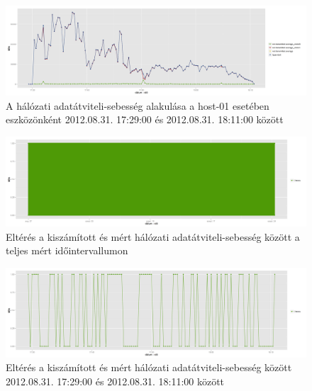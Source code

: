 \documentclass[a4paper,10pt,titlepage]{article}
\begin{document}
\begin{figure}[h!]
\centering
\includegraphics[width=1.00\textwidth]{figures/net_transmitted_average_dev-20120831172900-20120831181100.png}
\caption{ A hálózati adatátviteli-sebesség alakulása a host-01 esetében eszközönként 2012.08.31. 17:29:00 és 2012.08.31. 18:11:00 között \label{fig:net_transmitted_average_dev}}
\end{figure}

\begin{figure}[h!]
\centering
\includegraphics[width=1.00\textwidth]{figures/net_transmitted_average_diff-20120826230140-20120924083120.png}
\caption{ Eltérés a kiszámított és mért hálózati adatátviteli-sebesség között a teljes mért időintervallumon \label{fig:net_transmitted_average_diff-01}}
\end{figure}

\begin{figure}[h!]
\centering
\includegraphics[width=1.00\textwidth]{figures/net_transmitted_average_diff-20120831172900-20120831181100.png}
\caption{ Eltérés a kiszámított és mért hálózati adatátviteli-sebesség között 2012.08.31. 17:29:00 és 2012.08.31. 18:11:00 között \label{fig:net_transmitted_average_diff-02}}
\end{figure}
\end{document}
